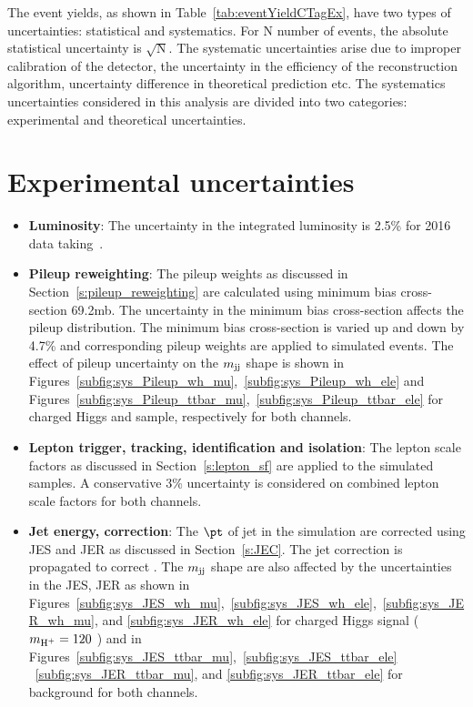 
The event yields, as shown in Table~\ref{tab:eventYieldCTagEx}, have two types of uncertainties: 
statistical and systematics. For N number of events, the absolute statistical uncertainty is 
$\sqrt{\text{N}}$. The systematic uncertainties arise due to improper calibration of the detector, 
the uncertainty in the efficiency of the reconstruction algorithm, uncertainty difference in 
theoretical prediction etc. The systematics uncertainties considered in this analysis are 
divided into two categories: experimental and theoretical uncertainties.

\section{Experimental uncertainties}
\begin{itemize}[leftmargin=*]
\item {\bf{Luminosity}}: The uncertainty in the integrated luminosity is 2.5\% for 2016 data taking~\cite{CMS-PAS-LUM-17-001}. 
\item {\bf {Pileup reweighting}}: The pileup weights as discussed in Section~\ref{s:pileup_reweighting}
    are calculated using minimum bias cross-section 69.2\unit{mb}. The uncertainty in the minimum 
    bias cross-section affects the pileup distribution. The 
    minimum bias cross-section is varied up and down by 4.7\% and corresponding pileup
    weights are applied to simulated events. The effect of pileup uncertainty on the $m_\text{jj}$
    shape is shown in Figures~\ref{subfig:sys_Pileup_wh_mu},~\ref{subfig:sys_Pileup_wh_ele} and
    Figures~\ref{subfig:sys_Pileup_ttbar_mu},~\ref{subfig:sys_Pileup_ttbar_ele} for charged Higgs
    and \ttjets sample, respectively for both channels.

\item {\bf {Lepton trigger, tracking, identification and isolation}}: 
    The lepton scale factors as discussed in Section~\ref{s:lepton_sf} are applied to the simulated
    samples. A conservative 3\% uncertainty is considered on combined lepton scale factors
    for both channels. 

\item {\bf {Jet energy, \MET correction}}: The $\pt$ of jet in the simulation are corrected using JES 
    and JER as discussed in Section~\ref{s:JEC}. The jet correction is propagated to correct 
    \MET. The $m_\text{jj}$ shape are also affected by the uncertainties in the JES, JER as shown in 
    Figures~\ref{subfig:sys_JES_wh_mu},~\ref{subfig:sys_JES_wh_ele},~\ref{subfig:sys_JER_wh_mu},
    and \ref{subfig:sys_JER_wh_ele} for charged Higgs signal ($m_{\text{H}^+} = 120$ \GeV) and in 
     Figures~\ref{subfig:sys_JES_ttbar_mu},~\ref{subfig:sys_JES_ttbar_ele} 
    ~\ref{subfig:sys_JER_ttbar_mu}, and \ref{subfig:sys_JER_ttbar_ele} for \ttjets 
    background for both channels. 


\end{itemize}
